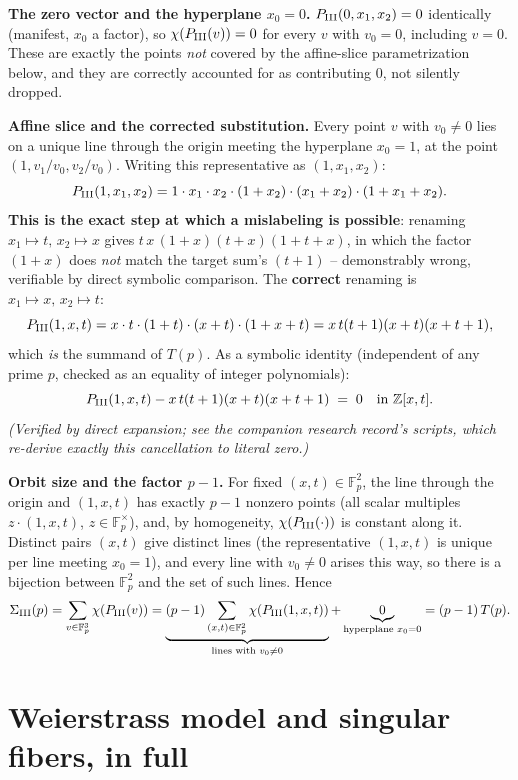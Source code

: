 \documentclass[11pt]{amsart}
\theoremstyle{definition}
\newcommand{\Fp}{\mathbb{F}_p}
\newcommand{\Z}{\mathbb{Z}}
\begin{document}
\textbf{The zero vector and the hyperplane $x_0=0$.} $P_{\rm III}(0,x_1,x_2)=0$
identically (manifest, $x_0$ a factor), so $\chi(P_{\rm III}(v))=0$ for
every $v$ with $v_0=0$, including $v=0$. These are exactly the points
\emph{not} covered by the affine-slice parametrization below, and they
are correctly accounted for as contributing $0$, not silently dropped.

\textbf{Affine slice and the corrected substitution.} Every point $v$
with $v_0\neq0$ lies on a unique line through the origin meeting the
hyperplane $x_0=1$, at the point $(1, v_1/v_0, v_2/v_0)$. Writing this
representative as $(1,x_1,x_2)$:
\[
P_{\rm III}(1,x_1,x_2) = 1\cdot x_1\cdot x_2\cdot(1+x_2)\cdot(x_1+x_2)\cdot(1+x_1+x_2).
\]
\textbf{This is the exact step at which a mislabeling is possible}: renaming
$x_1\mapsto t,\,x_2\mapsto x$ gives $t\,x\,(1+x)(t+x)(1+t+x)$, in which
the factor $(1+x)$ does \emph{not} match the target sum's $(t+1)$ --
demonstrably wrong, verifiable by direct symbolic comparison. The
\textbf{correct} renaming is $x_1\mapsto x,\,x_2\mapsto t$:
\[
P_{\rm III}(1,x,t) = x\cdot t\cdot(1+t)\cdot(x+t)\cdot(1+x+t) = x\,t(t+1)(x+t)(x+t+1),
\]
which \emph{is} the summand of $T(p)$. As a symbolic identity (independent
of any prime $p$, checked as an equality of integer polynomials):
\[
P_{\rm III}(1,x,t) - x\,t(t+1)(x+t)(x+t+1) \;=\; 0 \quad\text{in }\Z[x,t].
\]
\emph{(Verified by direct expansion; see the companion research record's
scripts, which re-derive exactly this cancellation to literal zero.)}

\textbf{Orbit size and the factor $p-1$.} For fixed $(x,t)\in\Fp^2$, the
line through the origin and $(1,x,t)$ has exactly $p-1$ nonzero points
(all scalar multiples $z\cdot(1,x,t)$, $z\in\Fp^\times$), and, by
homogeneity, $\chi(P_{\rm III}(\cdot))$ is constant along it. Distinct
pairs $(x,t)$ give distinct lines (the representative $(1,x,t)$ is unique
per line meeting $x_0=1$), and every line with $v_0\neq0$ arises this
way, so there is a bijection between $\Fp^2$ and the set of such lines.
Hence
\[
\Sigma_{\rm III}(p) = \sum_{v\in\Fp^3}\chi(P_{\rm III}(v))
= \underbrace{(p-1)\sum_{(x,t)\in\Fp^2}\chi(P_{\rm III}(1,x,t))}_{\text{lines with }v_0\neq0}
+ \underbrace{0}_{\text{hyperplane }x_0=0}
= (p-1)\,T(p).
\]

\section{Weierstrass model and singular fibers, in full}
\label{app:B}
\end{document}
